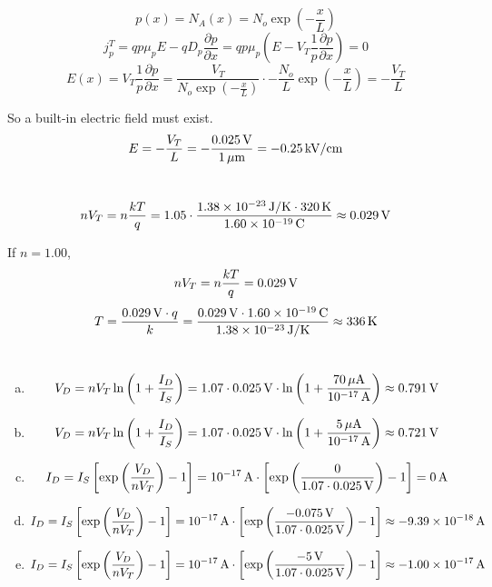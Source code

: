 \documentclass{article}
\newcommand{\unit}[1]{{\rm\,#1}}
\begin{document}
\section{}
$$p(x)=N_A(x)=N_o\exp\left(-\frac{x}{L}\right)$$
$$j_p^T=qp\mu_pE-qD_p\frac{\partial p}{\partial x}=qp\mu_p\left(E-V_T\frac{1}{p}\frac{\partial p}{\partial x}\right)=0$$
$$E(x)=V_T\frac{1}{p}\frac{\partial p}{\partial x}=\frac{V_T}{N_o\exp\left(-\frac{x}{L}\right)}\cdot-\frac{N_o}{L}\exp\left(-\frac{x}{L}\right)=-\frac{V_T}{L}$$

So a built-in electric field must exist.
$$E=-\frac{V_T}{L}=-\frac{0.025\unit{V}}{1\unit{\mu m}}=-0.25\unit{kV/cm}$$

\section{}
$$nV_T=n\frac{kT}{q}=1.05\cdot\frac{1.38\times10^{-23}\unit{J/K}\cdot320\unit{K}}{1.60\times10^{-19}\unit{C}}\approx0.029\unit{V}$$

If $n=1.00$,
$$nV_T=n\frac{kT}{q}=0.029\unit{V}$$
$$T=\frac{0.029\unit{V}\cdot q}{k}=\frac{0.029\unit{V}\cdot1.60\times10^{-19}\unit{C}}{1.38\times10^{-23}\unit{J/K}}\approx336\unit{K}$$

\section{}
\begin{enumerate}[(a)]
\item
$$V_D=nV_T\ln\left(1+\frac{I_D}{I_S}\right)=1.07\cdot0.025\unit{V}\cdot\ln\left(1+\frac{70\unit{\mu A}}{10^{-17}\unit{A}}\right)\approx0.791\unit{V}$$
\item
$$V_D=nV_T\ln\left(1+\frac{I_D}{I_S}\right)=1.07\cdot0.025\unit{V}\cdot\ln\left(1+\frac{5\unit{\mu A}}{10^{-17}\unit{A}}\right)\approx0.721\unit{V}$$
\item
$$I_D=I_S\left[\exp\left(\frac{V_D}{nV_T}\right)-1\right]=10^{-17}\unit{A}\cdot\left[\exp\left(\frac{0}{1.07\cdot0.025\unit{V}}\right)-1\right]=0\unit{A}$$
\item
$$I_D=I_S\left[\exp\left(\frac{V_D}{nV_T}\right)-1\right]=10^{-17}\unit{A}\cdot\left[\exp\left(\frac{-0.075\unit{V}}{1.07\cdot0.025\unit{V}}\right)-1\right]\approx-9.39\times10^{-18}\unit{A}$$
\item
$$I_D=I_S\left[\exp\left(\frac{V_D}{nV_T}\right)-1\right]=10^{-17}\unit{A}\cdot\left[\exp\left(\frac{-5\unit{V}}{1.07\cdot0.025\unit{V}}\right)-1\right]\approx-1.00\times10^{-17}\unit{A}$$
\end{enumerate}
\end{document}
